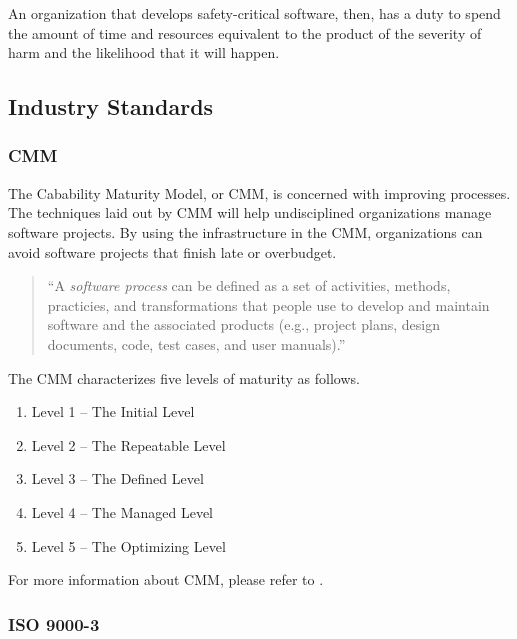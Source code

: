 \newpage
An organization that develops safety-critical software, then, has a duty to
spend the amount of time and resources equivalent to the product of the severity
of harm and the likelihood that it will happen.

\subsection{Industry Standards}
\subsubsection{CMM}
The Cabability Maturity Model, or CMM, is concerned with improving processes.
The techniques laid out by CMM will help undisciplined organizations manage
software projects. By using the infrastructure in the CMM, organizations can
avoid software projects that finish late or overbudget.

\begin{quote}
``A \textit{software process} can be defined as a set of activities, methods,
practicies, and transformations that people use to develop and maintain software
and the associated products (e.g., project plans, design documents, code, test
cases, and user manuals).''
\end{quote}

The CMM characterizes five levels of maturity as follows.
\begin{enumerate}
  \item Level 1 -- The Initial Level
  \item Level 2 -- The Repeatable Level
  \item Level 3 -- The Defined Level
  \item Level 4 -- The Managed Level
  \item Level 5 -- The Optimizing Level
\end{enumerate}

For more information about CMM, please refer to \cite{CMM11}.
\subsubsection{ISO 9000-3}


